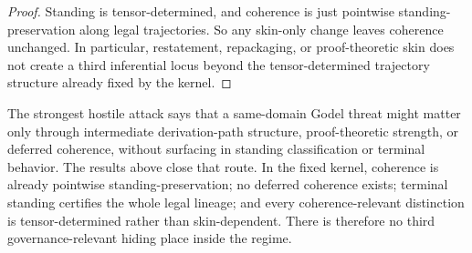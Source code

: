 \begin{proof}
Standing is tensor-determined, and coherence is just pointwise standing-preservation along legal trajectories. So any skin-only change leaves coherence unchanged. In particular, restatement, repackaging, or proof-theoretic skin does not create a third inferential locus beyond the tensor-determined trajectory structure already fixed by the kernel.
\end{proof}

\begin{remark}
The strongest hostile attack says that a same-domain Godel threat might matter only through intermediate derivation-path structure, proof-theoretic strength, or deferred coherence, without surfacing in standing classification or terminal behavior. The results above close that route. In the fixed kernel, coherence is already pointwise standing-preservation; no deferred coherence exists; terminal standing certifies the whole legal lineage; and every coherence-relevant distinction is tensor-determined rather than skin-dependent. There is therefore no third governance-relevant hiding place inside the regime.
\end{remark}
